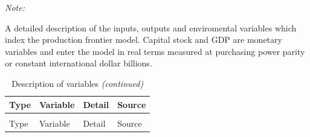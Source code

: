\documentclass[
  10pt,
]{article}
\begin{document}
\begin{ThreePartTable}
\begin{TableNotes}
\item \textit{Note: } 
\item A detailed description of the inputs, outputs and enviromental variables which index the production frontier model.  Capital stock and GDP are monetary variables and enter the model in real terms measured at purchasing power parity or constant international dollar billions.
\end{TableNotes}
\begin{longtabu} to 
\caption{\label{tab:variables}Description of variables}\\
\toprule
Type & Variable & Detail & Source\\
\midrule
\endfirsthead
\caption[]{Description of variables \textit{(continued)}}\\
\toprule
Type & Variable & Detail & Source\\
\midrule
\endhead


\end{longtabu}
\end{ThreePartTable}
\end{document}
